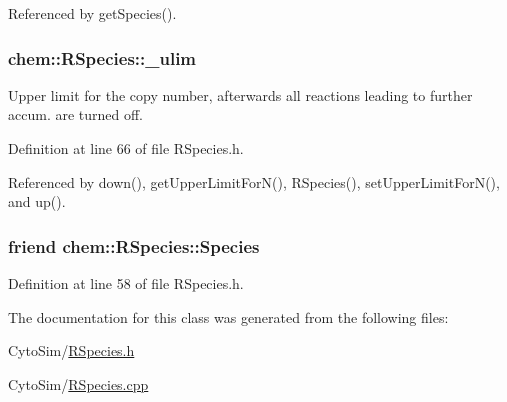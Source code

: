 Referenced by get\-Species().

\hypertarget{classchem_1_1RSpecies_a189084cfe75e004f42a6a27b2c1c09ad}{
\subsubsection[{\-\_\-ulim}]{ {\bf chem\-::\-R\-Species\-::\-\_\-ulim}}}\label{classchem_1_1RSpecies_a189084cfe75e004f42a6a27b2c1c09ad}


Upper limit for the copy number, afterwards all reactions leading to further accum. are turned off. 



Definition at line 66 of file R\-Species.\-h.



Referenced by down(), get\-Upper\-Limit\-For\-N(), R\-Species(), set\-Upper\-Limit\-For\-N(), and up().

\hypertarget{classchem_1_1RSpecies_af22c5fa6d6a8be2cd26b77fc4cbb820f}{
\subsubsection[{Species}]{\setlength{\rightskip}{0pt plus 5cm}friend {\bf chem\-::\-R\-Species\-::\-Species}}}\label{classchem_1_1RSpecies_af22c5fa6d6a8be2cd26b77fc4cbb820f}


Definition at line 58 of file R\-Species.\-h.



The documentation for this class was generated from the following files\-:\begin{DoxyCompactItemize}
\item 
Cyto\-Sim/\hyperlink{RSpecies_8h}{R\-Species.\-h}\item 
Cyto\-Sim/\hyperlink{RSpecies_8cpp}{R\-Species.\-cpp}\end{DoxyCompactItemize}
